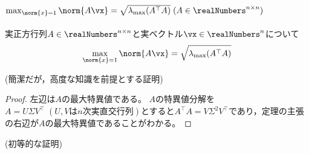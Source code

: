         \subsection{\texorpdfstring{$\max_{\norm{x}=1} \norm{A\vx} = \sqrt{\lambda_{\mathrm{max}}(A^\top A)}\;(A\in\realNumbers^{n\times n})$}{max\_\{||x||=1\} ||Ax|| = sqrt(λ\_max(A\string^⊤ A)) (A∈R\string^(n×n))}}
            \begin{shadebox}
                実正方行列$A \in \realNumbers^{n\times n}$と実ベクトル$\vx \in \realNumbers^n$について
                \[\max_{\norm{x}=1} \norm{A\vx} = \sqrt{\lambda_{\mathrm{max}}(A^\top A)}\]
            \end{shadebox}
            \noindent
            (簡潔だが，高度な知識を前提とする証明)
            \begin{proof}
                左辺は$A$の最大特異値である。
                $A$の特異値分解を$A=U\Sigma V^\top\;(U,V\text{は}n\text{次実直交行列})$とすると$A^\top A = V\Sigma^2V^\top$であり，定理の主張の右辺が$A$の最大特異値であることがわかる。
            \end{proof}
            \noindent
            (初等的な証明)
